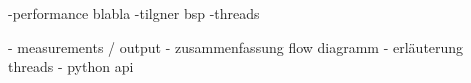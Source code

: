 
-performance blabla
-tilgner bsp
-threads

- measurements / output
- zusammenfassung flow diagramm
- erläuterung threads
- python api



